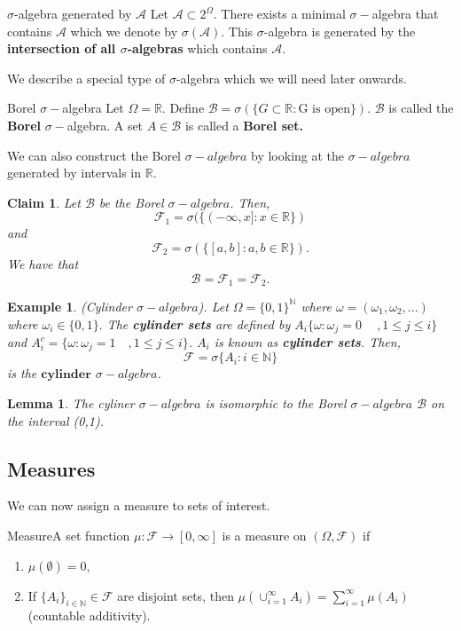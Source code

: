 \documentclass[twoside]{article}
\newtheorem{lemma}[theorem]{Lemma}
\newtheorem{claim}[theorem]{Claim}
\newtheorem{example}[theorem]{Example}
\newcommand{\sigmalgebra}{\mathcal{F}}
\newcommand{\borelsigmaalgebra}{\mathcal{B}}
\newcommand{\sa}{\sigma-algebra}
\begin{document}
\begin{definition_exam}{$\sigma$-algebra generated by $\mathcal{A}$}{} Let $\mathcal{A} \subset 2^{\Omega}$. There exists a minimal $\sigma-$algebra that contains $\mathcal{A}$ which we denote by $\sigma (\mathcal{A}).$ This $\sigma$-algebra is generated by the \textbf{intersection of all $\sigma$-algebras} which contains $\mathcal{A}.$
\end{definition_exam}


We describe a special type of $\sigma$-algebra which we will need later onwards.

\begin{definition_exam}{Borel $\sigma-$algebra}{} Let $\Omega = \mathbb{R}.$ Define $\borelsigmaalgebra = \sigma(\{G \subset \mathbb{R}: \text{G is open}\})$. $\borelsigmaalgebra$ is called the \textbf{Borel} $\sigma-$algebra. A set $A \in \mathcal{B}$ is called a \textbf{Borel set.}
\end{definition_exam}

We can also construct the Borel $\sa$ by looking at the $\sa$ generated by intervals in $\mathbb{R}$.

\begin{claim}Let $\mathcal{B}$ be the Borel $\sa$. Then, $$\sigmalgebra_1 = \sigma(\{(-\infty,x]: x \in \mathbb{R}\})$$
and 
$$\sigmalgebra_2 = \sigma(\{[a,b]: a,b \in \mathbb{R}\}).$$
We have that 
$$
\borelsigmaalgebra = \sigmalgebra_1 = \sigmalgebra_2.
$$
\end{claim}


\begin{example}(Cylinder $\sa$). Let $\Omega = \{0,1\}^{\mathbb{N}}$ where $\omega = (\omega_1,\omega_2,...)$ where $\omega_i \in \{0,1\}.$ The \textbf{cylinder sets} are defined by $A_i \{\omega: \omega_j = 0\ \quad ,1 \leq j \leq i \}$ and $A_i^c = \{\omega: \omega_j = 1 \quad ,1 \leq j \leq i\}$. $A_i$ is known as \textbf{cylinder sets}. Then, 
$$
\sigmalgebra = \sigma\{A_i: i \in \mathbb{N}\}
$$
is the $\textbf{cylinder}$ $\sa$.
\end{example}

\begin{lemma}The cyliner $\sa$ is isomorphic to the Borel $\sa$ $\borelsigmaalgebra$ on the interval (0,1).
\end{lemma}

\subsection{Measures}
We can now assign a measure to sets of interest.
\begin{definition_exam}{Measure}{}A set function $\mu: \sigmalgebra \rightarrow [0,\infty]$ is a measure on $(\Omega, \sigmalgebra)$ if 
\begin{enumerate}
\item $\mu(\emptyset) = 0,$
\item If $\{A_i\}_{i \in \mathbb{N}} \in \sigmalgebra$ are disjoint sets, then $\mu(\cup_{i=1}^{\infty}A_i) = \sum_{i=1}^{\infty}\mu(A_i)$ (countable additivity).
\end{enumerate}
\end{definition_exam}
\end{document}

